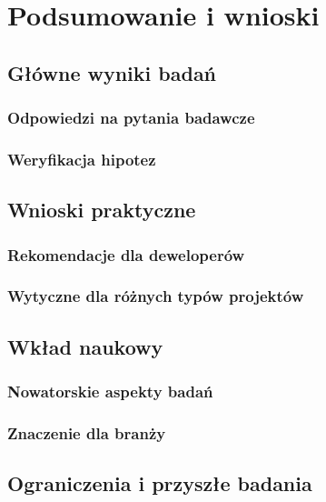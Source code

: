 \clearpage
\section{Podsumowanie i wnioski}

\subsection{Główne wyniki badań}
\subsubsection{Odpowiedzi na pytania badawcze}

\subsubsection{Weryfikacja hipotez}

\subsection{Wnioski praktyczne}
\subsubsection{Rekomendacje dla deweloperów}

\subsubsection{Wytyczne dla różnych typów projektów}

\subsection{Wkład naukowy}
\subsubsection{Nowatorskie aspekty badań}

\subsubsection{Znaczenie dla branży}

\subsection{Ograniczenia i przyszłe badania}
